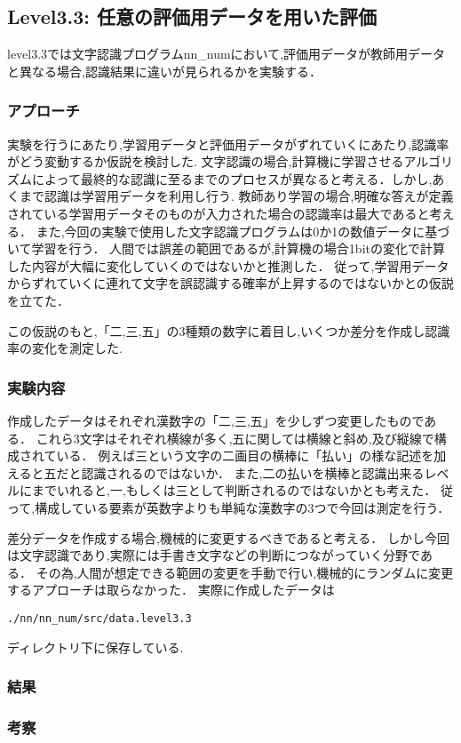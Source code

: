 \subsection{Level3.3: 任意の評価用データを用いた評価}

level3.3では文字認識プログラムnn\_numにおいて,評価用データが教師用データと異なる場合,認識結果に違いが見られるかを実験する．

\subsubsection{アプローチ}
実験を行うにあたり,学習用データと評価用データがずれていくにあたり,認識率がどう変動するか仮説を検討した.
文字認識の場合,計算機に学習させるアルゴリズムによって最終的な認識に至るまでのプロセスが異なると考える．しかし,あくまで認識は学習用データを利用し行う.
教師あり学習の場合,明確な答えが定義されている学習用データそのものが入力された場合の認識率は最大であると考える．
また,今回の実験で使用した文字認識プログラムは0か1の数値データに基づいて学習を行う．
人間では誤差の範囲であるが,計算機の場合1bitの変化で計算した内容が大幅に変化していくのではないかと推測した．
従って,学習用データからずれていくに連れて文字を誤認識する確率が上昇するのではないかとの仮説を立てた．

この仮説のもと,「二,三,五」の3種類の数字に着目し,いくつか差分を作成し認識率の変化を測定した.

\subsubsection{実験内容}
作成したデータはそれぞれ漢数字の「二,三,五」を少しずつ変更したものである．
これら3文字はそれぞれ横線が多く,五に関しては横線と斜め,及び縦線で構成されている．
例えば三という文字の二画目の横棒に「払い」の様な記述を加えると五だと認識されるのではないか．
また,二の払いを横棒と認識出来るレベルにまでいれると,一,もしくは三として判断されるのではないかとも考えた．
従って,構成している要素が英数字よりも単純な漢数字の3つで今回は測定を行う．

差分データを作成する場合,機械的に変更するべきであると考える．
しかし今回は文字認識であり,実際には手書き文字などの判断につながっていく分野である．
その為,人間が想定できる範囲の変更を手動で行い,機械的にランダムに変更するアプローチは取らなかった．
実際に作成したデータは
\begin{oframed}
\begin{verbatim}
./nn/nn_num/src/data.level3.3
\end{verbatim}
\end{oframed}
ディレクトリ下に保存している.

\subsubsection{結果}

\subsubsection{考察}

